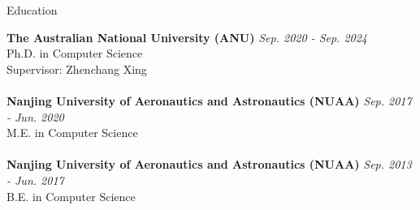\documentclass[
	11pt, %
]{resume} %
\begin{document}
\begin{rSection}{Education}
	
	\textbf{The Australian National University (ANU)} \hfill \textit{Sep. 2020 - Sep. 2024} \\ 
	Ph.D. in Computer Science\\
    Supervisor: Zhenchang Xing \\\\
    \textbf{Nanjing University of Aeronautics and Astronautics (NUAA)} \hfill \textit{Sep. 2017 - Jun. 2020} \\ 
	M.E. in Computer Science\\
     \\
    \textbf{Nanjing University of Aeronautics and Astronautics (NUAA)} \hfill \textit{Sep. 2013 - Jun. 2017} \\ 
	B.E. in Computer Science
 
	
\end{rSection}
\end{document}
